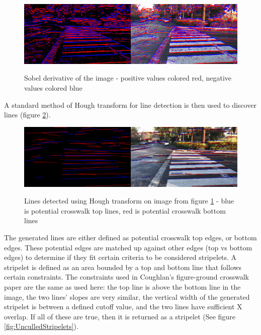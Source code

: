 \documentclass[12pt]{ucthesis}
\newcommand{\captionfonts}{\small\bf\ssp}
\begin{document}
\begin{figure}[h!]
\begin{center}
\includegraphics[width=14cm]{TopAndBottomSobel.png}
\captionfonts
\caption[Sobel Derivative of Crosswalk Image]{Sobel derivative of the image - positive values colored red, negative values colored blue}
\label{fig:TopAndBottomSobel}
\end{center}
\end{figure}

A standard method of Hough transform for line detection is then used to discover lines (figure \ref{fig:HoughLinesAfterMerge}). 

\begin{figure}[h!]
\begin{center}
\includegraphics[width=14cm]{HoughLinesAfterMerge.png}
\captionfonts
\caption[Hough Line Transform Detection Result]{Lines detected using Hough transform on image from figure \ref{fig:TopAndBottomSobel} - blue is potential crosswalk top lines, red is potential crosswalk bottom lines}
\label{fig:HoughLinesAfterMerge}
\end{center}
\end{figure}

The generated lines are either defined as potential crosswalk top edges, or bottom edges. These potential edges are matched up against other edges (top vs bottom edges) to determine if they fit certain criteria to be considered stripelets. A stripelet is defined as an area bounded by a top and bottom line that follows certain constraints. The constraints used in Coughlan's figure-ground crosswalk paper \cite{Coughlan2006} are the same as used here: the top line is above the bottom line in the image, the two lines' slopes are very similar, the vertical width of the generated stripelet is between a defined cutoff value, and the two lines have sufficient X overlap. If all of these are true, then it is returned as a stripelet (See figure \ref{fig:UnculledStripelets}). 
\end{document}

